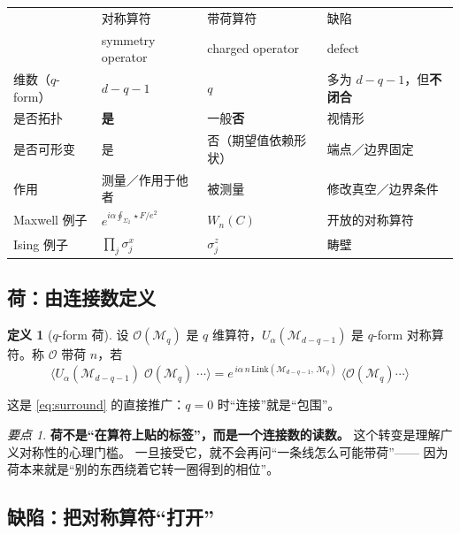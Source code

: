 \documentclass[UTF8,a4paper,11pt]{ctexart}
\theoremstyle{plain}
\theoremstyle{definition}
\newtheorem{definition}{定义}[section]
\theoremstyle{remark}
\newtheorem{keypoint}{要点}[section]
\newcommand{\hs}{\star}                %
\newcommand{\Link}{\mathrm{Link}}
\newcommand{\Op}{\mathcal{O}}
\newcommand{\Mfd}{\mathcal{M}}
\newcommand{\Ssurf}{\Sigma}
\newcommand{\en}[1]{\textsf{#1}}       %
\newcommand{\Uop}{U}
\begin{document}
\begin{center}
\begin{tabular}{@{}llll@{}}
\toprule
 & 对称算符 & 带荷算符 & 缺陷 \\
 & \en{symmetry operator} & \en{charged operator} & \en{defect} \\
\midrule
维数（$q$-form） & $d-q-1$ & $q$ & 多为 $d-q-1$，但\textbf{不闭合} \\
是否拓扑 & \textbf{是} & 一般\textbf{否} & 视情形 \\
是否可形变 & 是 & 否（期望值依赖形状） & 端点／边界固定 \\
作用 & 测量／作用于他者 & 被测量 & 修改真空／边界条件 \\
Maxwell 例子 & $e^{i\alpha\oint_{\Ssurf_2}\hs F/e^2}$ & $W_n(C)$ & 开放的对称算符 \\
Ising 例子 & $\prod_j\sigma^x_j$ & $\sigma^z_j$ & 畴壁 \\
\bottomrule
\end{tabular}
\end{center}

\subsection{荷：由连接数定义}

\begin{definition}[$q$-form 荷]
设 $\Op(\Mfd_q)$ 是 $q$ 维算符，$\Uop_\alpha(\Mfd_{d-q-1})$ 是
$q$-form 对称算符。称 $\Op$ 带荷 $n$，若
\begin{equation}
  \boxed{\
  \big\langle \Uop_\alpha(\Mfd_{d-q-1})\;\Op(\Mfd_q)\;\cdots\big\rangle
  = e^{\,i\alpha\,n\,\Link(\Mfd_{d-q-1},\,\Mfd_q)}\;
  \big\langle \Op(\Mfd_q)\cdots\big\rangle \ }
  \label{eq:chargedef-q}
\end{equation}
\end{definition}

这是 \eqref{eq:surround} 的直接推广：$q=0$ 时“连接”就是“包围”。

\begin{keypoint}
\label{kp:linking-is-charge}
\textbf{荷不是“在算符上贴的标签”，而是一个连接数的读数。}
这个转变是理解广义对称性的心理门槛。
一旦接受它，就不会再问“一条线怎么可能带荷”——
因为荷本来就是“别的东西绕着它转一圈得到的相位”。
\end{keypoint}

\subsection{缺陷：把对称算符“打开”}
\label{subsec:defects}
\end{document}
